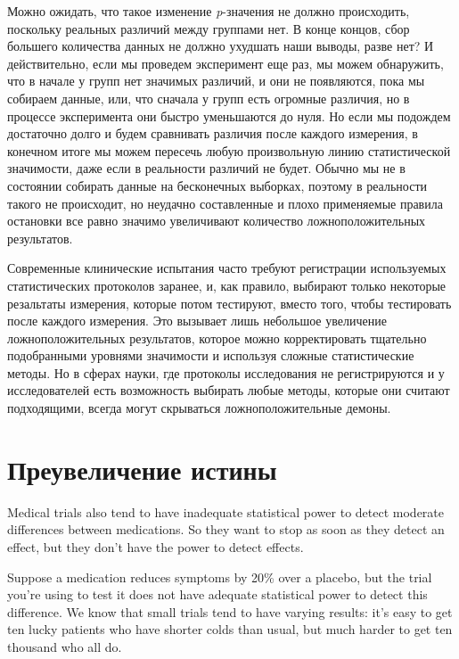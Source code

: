 Можно ожидать, что такое изменение \emph{p}-значения не должно происходить, поскольку реальных различий между группами нет. В конце концов, сбор большего количества данных не должно ухудшать наши выводы, разве нет? И действительно, если мы проведем эксперимент еще раз, мы можем обнаружить, что в начале у групп нет значимых различий, и они не появляются, пока мы собираем данные, или, что сначала у групп есть огромные различия, но в процессе эксперимента они быстро уменьшаются до нуля. Но если мы подождем достаточно долго и будем сравнивать различия после каждого измерения, в конечном итоге мы можем пересечь любую произвольную линию статистической значимости, даже если в реальности различий не будет. Обычно мы не в состоянии собирать данные на бесконечных выборках, поэтому в реальности такого не происходит, но неудачно  составленные и плохо применяемые правила остановки все равно значимо увеличивают количество ложноположительных результатов. \cite{simmons_false-positive_2011}  


Современные клинические испытания часто требуют регистрации используемых статистических протоколов заранее, и, как правило, выбирают только некоторые резальтаты измерения, которые потом тестируют, вместо того, чтобы тестировать после каждого измерения. Это вызывает лишь небольшое увеличение ложноположительных результатов, которое можно корректировать тщательно подобранными уровнями значимости и используя сложные статистические методы.\cite{todd_interim_2001} Но в сферах науки, где протоколы исследования не регистрируются и у исследователей есть возможность выбирать любые методы, которые они считают подходящими, всегда могут скрываться ложноположительные демоны.


\section{Преувеличение истины}
\label{chp7:truthinflation}

Medical trials also tend to have inadequate statistical power to detect moderate differences between medications. So they want to stop as soon as they detect an effect, but they don’t have the power to detect effects.

Suppose a medication reduces symptoms by 20\% over a placebo, but the trial you’re using to test it does not have adequate statistical power to detect this difference. We know that small trials tend to have varying results: it’s easy to get ten lucky patients who have shorter colds than usual, but much harder to get ten thousand who all do.

